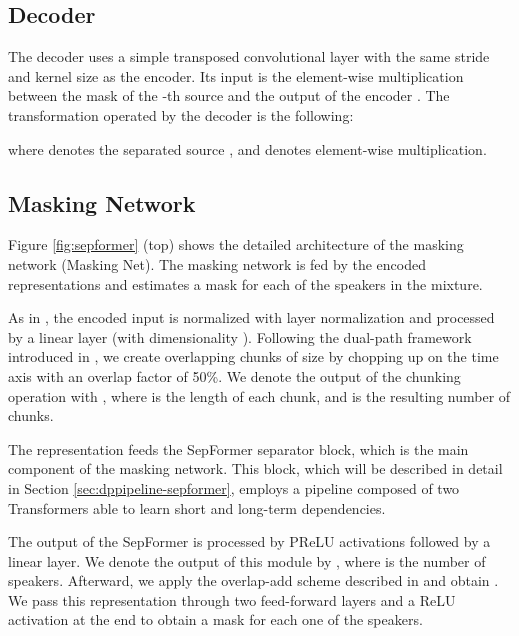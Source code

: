 \documentclass[lettersize,journal]{IEEEtran}
\begin{document}
\subsection{Decoder}
The decoder uses a simple transposed convolutional layer with the same stride and kernel size as the encoder. Its input is the element-wise multiplication between the mask of the  -th source  and the output of the encoder . The transformation operated by the decoder is the following: 

where  denotes the separated source , and  denotes element-wise multiplication. 


\subsection{Masking Network}
\label{sec:maskingnetwork}
Figure \ref{fig:sepformer} (top) shows the detailed architecture of the masking network (Masking Net).
The masking network is fed by the encoded representations  and estimates a mask  for each of the  speakers in the mixture. 

As in \cite{luo2018convtasnet}, the encoded input  is normalized with layer normalization \cite{layernorm} and processed by a linear layer (with dimensionality ). 
Following the dual-path framework introduced in \cite{luo2020dualpath}, we create overlapping chunks of size  by chopping up  on the time axis with an overlap factor of 50\%. We denote the output of the chunking operation with , where  is the length of each chunk, and  is the resulting number of chunks. 

The representation  feeds the SepFormer separator block, which is the main component of the masking network. This block, which will be described in detail in Section \ref{sec:dppipeline-sepformer}, employs a pipeline composed of two Transformers able to learn short and long-term dependencies.  

The output of the SepFormer  is processed by PReLU activations followed by a linear layer.  
We denote the output of this module by , where  is the number of speakers. Afterward, we apply the overlap-add scheme described in \cite{luo2020dualpath} and obtain . We pass this representation through two feed-forward layers and a ReLU activation at the end to obtain a mask  for each one of the speakers.
\end{document}
